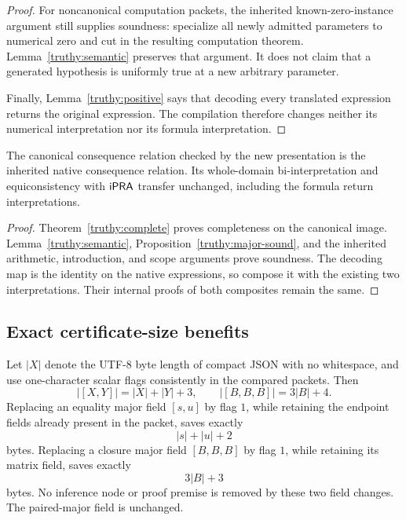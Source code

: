 \begin{proof}
For noncanonical computation packets, the inherited known-zero-instance
argument still supplies soundness: specialize all newly admitted
parameters to numerical zero and cut in the resulting computation
theorem.  Lemma~\ref{truthy:semantic} preserves that argument.  It
does not claim that a generated hypothesis is uniformly true at a
new arbitrary parameter.

Finally, Lemma~\ref{truthy:positive} says that decoding every translated
expression returns the original expression.  The compilation therefore
changes neither its numerical interpretation nor its formula
interpretation.
\end{proof}

\begin{corollary}
The canonical consequence relation checked by the new presentation
is the inherited native consequence relation.  Its whole-domain
bi-interpretation and equiconsistency with \(\mathsf{iPRA}\) transfer unchanged,
including the formula return interpretations.
\end{corollary}

\begin{proof}
Theorem~\ref{truthy:complete} proves completeness on the canonical
image.  Lemma~\ref{truthy:semantic},
Proposition~\ref{truthy:major-sound}, and the inherited arithmetic,
introduction, and scope arguments prove soundness.
The decoding map is the identity on the native expressions, so
compose it with the existing two interpretations.  Their internal
proofs of both composites remain the same.
\end{proof}

\subsection{Exact certificate-size benefits}

Let \(|X|\) denote the UTF-8 byte length of compact JSON with no
whitespace, and use one-character scalar flags consistently in the
compared packets.  Then
\[
 |[X,Y]|=|X|+|Y|+3,\qquad
 |[B,B,B]|=3|B|+4.
\]
Replacing an equality major field \([s,u]\) by flag \(1\), while retaining
the endpoint fields already present in the packet, saves exactly
\[
                  \boxed{|s|+|u|+2}
 \tag{Equality saving}\label{truthy:eq-saving}
\]
bytes.  Replacing a closure major field \([B,B,B]\) by flag \(1\),
while retaining its matrix field, saves exactly
\[
                       \boxed{3|B|+3}
 \tag{Closure saving}\label{truthy:q-saving}
\]
bytes.  No inference node or proof premise is removed by these two
field changes.  The paired-major field is unchanged.

